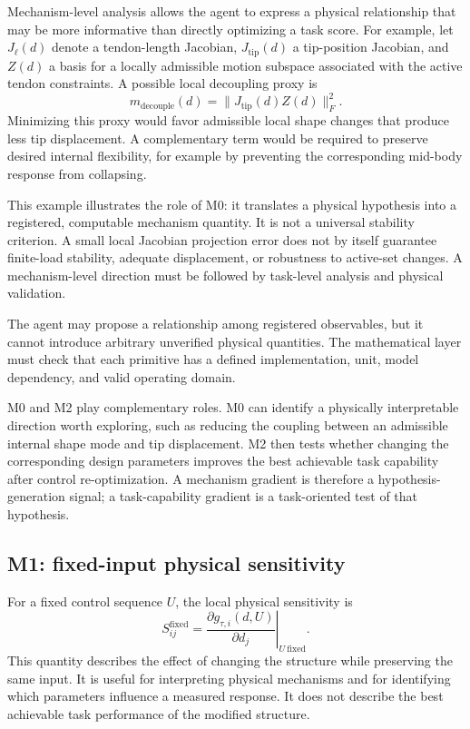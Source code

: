 Mechanism-level analysis allows the agent to express a physical relationship that may be more informative than directly optimizing a task score. For example, let $J_\ell(d)$ denote a tendon-length Jacobian, $J_{\mathrm{tip}}(d)$ a tip-position Jacobian, and $Z(d)$ a basis for a locally admissible motion subspace associated with the active tendon constraints. A possible local decoupling proxy is
\begin{equation}
m_{\mathrm{decouple}}(d)
=\|J_{\mathrm{tip}}(d)Z(d)\|_F^2.
\label{eq:decoupling}
\end{equation}
Minimizing this proxy would favor admissible local shape changes that produce less tip displacement. A complementary term would be required to preserve desired internal flexibility, for example by preventing the corresponding mid-body response from collapsing.

This example illustrates the role of M0: it translates a physical hypothesis into a registered, computable mechanism quantity. It is not a universal stability criterion. A small local Jacobian projection error does not by itself guarantee finite-load stability, adequate displacement, or robustness to active-set changes. A mechanism-level direction must be followed by task-level analysis and physical validation.

The agent may propose a relationship among registered observables, but it cannot introduce arbitrary unverified physical quantities. The mathematical layer must check that each primitive has a defined implementation, unit, model dependency, and valid operating domain.


M0 and M2 play complementary roles. M0 can identify a physically interpretable direction worth exploring, such as reducing the coupling between an admissible internal shape mode and tip displacement. M2 then tests whether changing the corresponding design parameters improves the best achievable task capability after control re-optimization. A mechanism gradient is therefore a hypothesis-generation signal; a task-capability gradient is a task-oriented test of that hypothesis.

\subsection{M1: fixed-input physical sensitivity}

For a fixed control sequence $U$, the local physical sensitivity is
\begin{equation}
S^{\mathrm{fixed}}_{ij}
=
\left.
\frac{\partial g_{\tau,i}(d,U)}{\partial d_j}
\right|_{U\ \mathrm{fixed}}.
\label{eq:fixed-sensitivity}
\end{equation}
This quantity describes the effect of changing the structure while preserving the same input. It is useful for interpreting physical mechanisms and for identifying which parameters influence a measured response. It does not describe the best achievable task performance of the modified structure.

